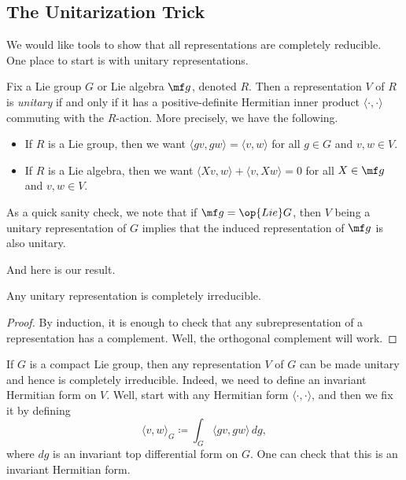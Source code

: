\documentclass[../notes.tex]{subfiles}
\begin{document}
\subsection{The Unitarization Trick}
We would like tools to show that all representations are completely reducible. One place to start is with unitary representations.
\begin{definition}
	Fix a Lie group $G$ or Lie algebra $\mf g$, denoted $R$. Then a representation $V$ of $R$ is \textit{unitary} if and only if it has a positive-definite Hermitian inner product $\langle\cdot,\cdot\rangle$ commuting with the $R$-action. More precisely, we have the following.
	\begin{itemize}
		\item If $R$ is a Lie group, then we want $\langle gv,gw\rangle=\langle v,w\rangle$ for all $g\in G$ and $v,w\in V$.
		\item If $R$ is a Lie algebra, then we want $\langle Xv,w\rangle+\langle v,Xw\rangle=0$ for all $X\in\mf g$ and $v,w\in V$.
	\end{itemize}
\end{definition}
\begin{remark}
	As a quick sanity check, we note that if $\mf g=\op{Lie}G$, then $V$ being a unitary representation of $G$ implies that the induced representation of $\mf g$ is also unitary.
\end{remark}
And here is our result.
\begin{proposition}
	Any unitary representation is completely irreducible.
\end{proposition}
\begin{proof}
	By induction, it is enough to check that any subrepresentation of a representation has a complement. Well, the orthogonal complement will work.
\end{proof}
\begin{example}
	If $G$ is a compact Lie group, then any representation $V$ of $G$ can be made unitary and hence is completely irreducible. Indeed, we need to define an invariant Hermitian form on $V$. Well, start with any Hermitian form $\langle\cdot,\cdot\rangle$, and then we fix it by defining
	\[\langle v,w\rangle_G\coloneqq\int_G\langle gv,gw\rangle\,dg,\]
	where $dg$ is an invariant top differential form on $G$. One can check that this is an invariant Hermitian form.
\end{example}
\end{document}
